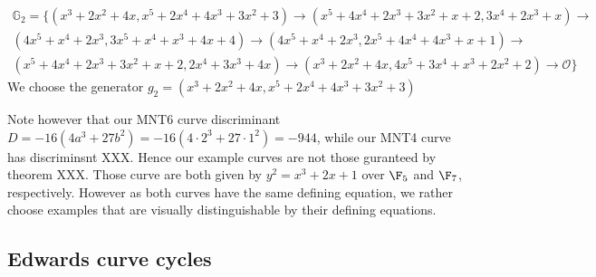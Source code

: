 \begin{multline*}
\mathbb{G}_2=\{ 
(x^3+2x^2+4x,x^5+2x^4+4x^3+3x^2+3)\to
(x^5+4x^4+2x^3+3x^2+x+2,3x^4+2x^3+x)\to\\
(4x^5+x^4+2x^3,3x^5+x^4+x^3+4x+4)\to
(4x^5+x^4+2x^3,2x^5+4x^4+4x^3+x+1) \to\\
(x^5+4x^4+2x^3+3x^2+x+2,2x^4+3x^3+4x)\to
(x^3+2x^2+4x,4x^5+3x^4+x^3+2x^2+2)\to
\mathcal{O}\}
\end{multline*}
We choose the generator $g_2 = (x^3+2x^2+4x,x^5+2x^4+4x^3+3x^2+3)$

\begin{remark}
Note however that our MNT6 curve discriminant $D=-16(4a^3 + 27 b^2)= -16(4\cdot 2^3 + 27\cdot 1^2)=-944$, while our MNT4 curve has discriminsnt XXX. Hence our example curves are not those guranteed by theorem XXX. Those curve are both given by $y^2= x^3 + 2x +1$ over $\F_5$ and $\F_7$, respectively. However as both curves have the same defining equation, we rather choose examples that are visually distinguishable by their defining equations.




\end{remark}

\subsection{Edwards curve cycles}
